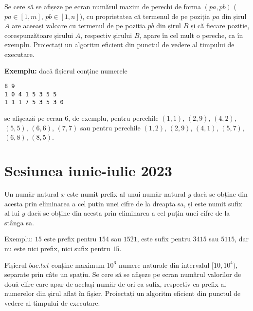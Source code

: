 \documentclass[10pt, a4paper]{article}
\newcommand{\highlight}[1]{{\ttfamily\color{red}#1}}
\begin{document}
\vspace{0.2cm}
\noindent Se cere să se afișeze pe ecran numărul maxim de perechi de forma \highlight{$(pa,pb)$} (\highlight{$pa \in [1,m]$}, \highlight{$pb \in  [1,n]$}), cu proprietatea că termenul de pe poziția \highlight{$pa$} din șirul \highlight{$A$} are aceeași valoare cu termenul de pe poziția \highlight{$pb$} din șirul \highlight{$B$} și că fiecare poziție, corespunzătoare șirului \highlight{$A$}, respectiv șirului \highlight{$B$}, apare în cel mult o pereche, ca în exemplu. Proiectați un algoritm eficient din punctul de vedere al timpului de executare.

\vspace{0.2cm}
\noindent \textbf{Exemplu:} dacă fișierul conține numerele
\begin{verbatim}
8 9
1 0 4 1 5 3 5 5
1 1 1 7 5 3 5 3 0
\end{verbatim}
\noindent se afișează pe ecran \highlight{$6$}, de exemplu, pentru perechile \highlight{$(1,1)$}, \highlight{$(2,9)$}, \highlight{$(4,2)$}, \highlight{$(5,5)$}, \highlight{$(6,6)$}, \highlight{$(7,7)$} sau pentru perechile \highlight{$(1,2)$}, \highlight{$(2,9)$}, \highlight{$(4,1)$}, \highlight{$(5,7)$}, \highlight{$(6,8)$}, \highlight{$(8,5)$}.

\section{Sesiunea iunie-iulie 2023}
Un număr natural \highlight{$x$} este numit prefix al unui număr natural \highlight{$y$} dacă se obține din acesta prin eliminarea a cel puțin unei cifre de la dreapta sa, și este numit sufix al lui \highlight{$y$} dacă se obține din acesta prin eliminarea a cel puțin unei cifre de la stânga sa.

\vspace{0.2cm}
\noindent Exemplu: \highlight{$15$} este prefix pentru \highlight{$154$} sau \highlight{$1521$}, este sufix pentru \highlight{$3415$} sau \highlight{$5115$}, dar nu este nici prefix, nici sufix pentru \highlight{$15$}.

\vspace{0.2cm}
\noindent Fișierul \highlight{$bac.txt$} conține maximum \highlight{$10^6$} numere naturale din intervalul \highlight{$[10,10^4)$}, separate prin câte un spațiu. Se cere să se afișeze pe ecran numărul valorilor de două cifre care apar de același număr de ori ca sufix, respectiv ca prefix al numerelor din șirul aflat în fișier. Proiectați un algoritm eficient din punctul de vedere al timpului de executare.
\end{document}

